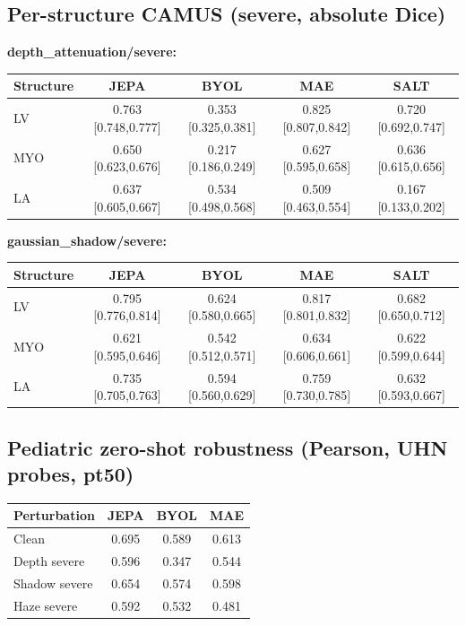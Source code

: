 \documentclass{article}
\begin{document}
\subsection{Per-structure CAMUS (severe, absolute Dice)}

\textbf{depth\_attenuation/severe:}
\begin{center}
\begin{tabular}{lcccc}
\toprule
Structure & JEPA & BYOL & MAE & SALT \\
\midrule
LV  & 0.763 [0.748,0.777] & 0.353 [0.325,0.381] & 0.825 [0.807,0.842] & 0.720 [0.692,0.747] \\
MYO & 0.650 [0.623,0.676] & 0.217 [0.186,0.249] & 0.627 [0.595,0.658] & 0.636 [0.615,0.656] \\
LA  & 0.637 [0.605,0.667] & 0.534 [0.498,0.568] & 0.509 [0.463,0.554] & 0.167 [0.133,0.202] \\
\bottomrule
\end{tabular}
\end{center}

\textbf{gaussian\_shadow/severe:}
\begin{center}
\begin{tabular}{lcccc}
\toprule
Structure & JEPA & BYOL & MAE & SALT \\
\midrule
LV  & 0.795 [0.776,0.814] & 0.624 [0.580,0.665] & 0.817 [0.801,0.832] & 0.682 [0.650,0.712] \\
MYO & 0.621 [0.595,0.646] & 0.542 [0.512,0.571] & 0.634 [0.606,0.661] & 0.622 [0.599,0.644] \\
LA  & 0.735 [0.705,0.763] & 0.594 [0.560,0.629] & 0.759 [0.730,0.785] & 0.632 [0.593,0.667] \\
\bottomrule
\end{tabular}
\end{center}

\subsection{Pediatric zero-shot robustness (Pearson, UHN probes, pt50)}

\begin{center}
\begin{tabular}{lccc}
\toprule
Perturbation & JEPA & BYOL & MAE \\
\midrule
Clean          & 0.695 & 0.589 & 0.613 \\
Depth severe   & 0.596 & 0.347 & 0.544 \\
Shadow severe  & 0.654 & 0.574 & 0.598 \\
Haze severe    & 0.592 & 0.532 & 0.481 \\
\bottomrule
\end{tabular}
\end{center}
\end{document}
